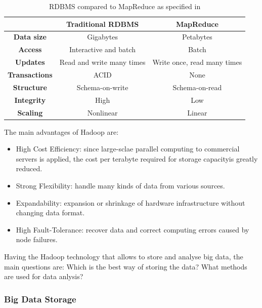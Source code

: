 \begin{table}[!ht]
\begin{center}
\caption{RDBMS compared to MapReduce as specified in \cite{tableHadoop}}
\begin{tabular}{| c | c | c |}
\hline
  & \textbf{Traditional RDBMS} & \textbf{MapReduce} \\
\hline
 \textbf{Data size}& Gigabytes & Petabytes \\
\hline
 \textbf{Access}& Interactive and batch & Batch \\
\hline
\textbf{Updates} & Read and write many times & Write once, read many times \\
\hline
\textbf{Transactions} & ACID & None \\
\hline
\textbf{Structure} & Schema-on-write & Schema-on-read \\
\hline
\textbf{Integrity} & High & Low \\
\hline
\textbf{Scaling} & Nonlinear & Linear \\
\hline
\end{tabular}
\label{table:mrdiff}
\vspace{-2.5em}
\end{center}
\end{table}

The main advantages of Hadoop are:
\begin{itemize}

 \item High Cost Efficiency: since large-sclae parallel computing to commercial servers is applied, the cost per terabyte required for storage capacityis greatly reduced.

 \item Strong Flexibility: handle many kinds of data from various sources.

 \item Expandability: expansion or shrinkage of hardware infrastructure without changing data format.

 \item High Fault-Tolerance: recover data and correct computing errors caused by node failures.

\end{itemize}

Having the Hadoop technology that allows to store and analyse big data, the main questions are: Which is the best way of storing the data? What methods are used for data anlysis? 

\subsubsection{Big Data Storage}

